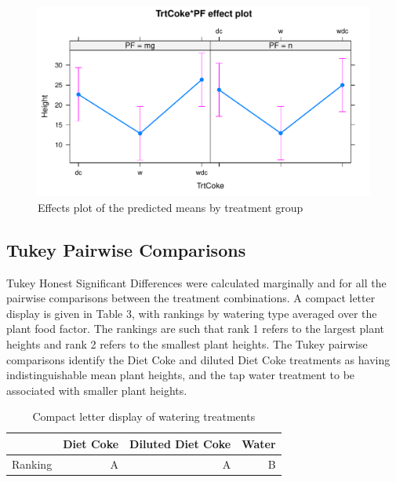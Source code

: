 \documentclass[1p,12pt]{elsarticle}\usepackage[]{graphicx}\usepackage[]{color}
\makeatletter
\def\maxwidth{ %
  \ifdim\Gin@nat@width>\linewidth
    \linewidth
  \else
    \Gin@nat@width
  \fi
}
\newenvironment{knitrout}{}{} %
\makeatother
\begin{document}
\begin{knitrout}
\color{fgcolor}\begin{figure}
\includegraphics[width=\maxwidth]{figure/model_-1} \caption[Effects plot of the predicted means by treatment group]{Effects plot of the predicted means by treatment group}\label{fig:model }
\end{figure}


\end{knitrout}


\subsection{Tukey Pairwise Comparisons}

Tukey Honest Significant Differences were calculated marginally and for all the pairwise comparisons between the treatment combinations. A compact letter display is given in Table 3, with rankings by watering type averaged over the plant food factor. The rankings are such that rank 1 refers to the largest plant heights and rank 2 refers to the smallest plant heights.  The Tukey pairwise comparisons identify the Diet Coke and diluted Diet Coke treatments as having indistinguishable mean plant heights, and the tap water treatment to be associated with smaller plant heights. 

\begin{table}[ht]
\centering
\begin{tabular}{lrrr}
  \hline
 & Diet Coke & Diluted Diet Coke & Water \\ 
  \hline
Ranking & A & A & B \\ 
  
   \hline
\end{tabular}
\caption{Compact letter display of watering treatments}
\end{table}
\end{document}
